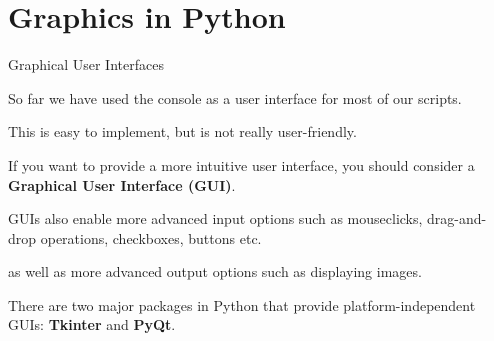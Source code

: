 \section{Graphics in Python}

\begin{frame}[plain]
    \sectionpage
\end{frame}


\begin{frame}[fragile]{Graphical User Interfaces}

    So far we have used the console as a user interface for most of our scripts.

    \vspace{1em}

    This is easy to implement, but is not really user-friendly.

    \vspace{1em}

    If you want to provide a more intuitive user interface, you should consider a \textbf{Graphical User Interface (GUI)}.

    \vspace{1em}

    GUIs also enable more advanced input options such as mouseclicks, drag-and-drop operations, checkboxes, buttons etc. 

    as well as more advanced output options such as displaying images.

    \vspace{1em}

    There are two major packages in Python that provide platform-independent GUIs: \textbf{Tkinter} and \textbf{PyQt}.


\end{frame}


